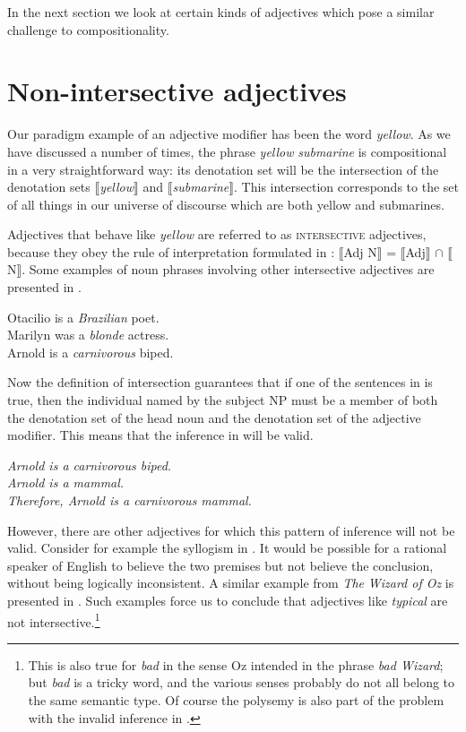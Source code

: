 In the next section we look at certain kinds of adjectives which pose a similar challenge to compositionality.


\section{Non-intersective adjectives}\label{sec:15.3}\largerpage

Our paradigm example of an adjective modifier has been the word \textit{yellow}. As we have discussed a number of times, the phrase \textit{yellow} \textit{submarine} is compositional in a very straightforward way: its denotation set will be the intersection of the denotation sets $\llbracket$\textit{yellow}$\rrbracket$  and $\llbracket$\textit{submarine}$\rrbracket$. This intersection corresponds to the set of all things in our universe of discourse which are both yellow and submarines.



Adjectives that behave like \textit{yellow} are referred to as \textsc{intersective} adjectives, because they obey the rule of interpretation formulated in : $\llbracket$Adj N$\rrbracket$  = $\llbracket$Adj$\rrbracket$  ${\cap}$ $\llbracket$N$\rrbracket$. Some examples of noun phrases involving other intersective adjectives are presented in .


\ea \label{ex:15.4}
\ea  Otacilio is a \textit{Brazilian} poet.\\
\ex Marilyn was a \textit{blonde} actress.\\
\ex Arnold is a \textit{carnivorous} biped.
                       \z
\z


Now the definition of intersection guarantees that if one of the sentences in  is true, then the individual named by the subject NP must be a member of both the denotation set of the head noun and the denotation set of the adjective modifier. This means that the inference in  will be valid.


\ea \label{ex:15.5}
\textit{Arnold is a carnivorous biped.}\\
\textit{Arnold is a mammal.\\
\FelixHRule
Therefore, Arnold is a carnivorous mammal.}
\z


However, there are other adjectives for which this pattern of inference will not be valid. Consider for example the syllogism in . It would be possible for a rational speaker of English to believe the two premises but not believe the conclusion, without being logically inconsistent. A similar example from \textit{The} \textit{Wizard of Oz} is presented in . Such examples force us to conclude that adjectives like \textit{typical} are not intersective.\footnote{This is also true for \textit{bad} in the sense Oz intended in the phrase \textit{bad Wizard}; but \textit{bad} is a tricky word, and the various senses probably do not all belong to the same semantic type. Of course the polysemy is also part of the problem with the invalid inference in .}\largerpage


